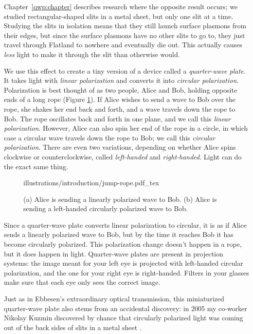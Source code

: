 Chapter~\ref{qwp:chapter} describes research where the opposite result occurs; we studied rectangular-shaped slits in a metal sheet, but only one slit at a time.
Studying the slits in isolation means that they still launch surface plasmons from their edges, but since the surface plasmons have no other slits to go to, they just travel through Flatland to nowhere and eventually die out.
This actually causes \emph{less} light to make it through the slit than otherwise would.

We use this effect to create a tiny version of a device called a \emph{quarter-wave plate}.
It takes light with \emph{linear polarization} and converts it into \emph{circular polarization}.
Polarization is best thought of as two people, Alice and Bob, holding opposite ends of a long rope (Figure \ref{introduction:fig:jump-rope}).
If Alice wishes to send a wave to Bob over the rope, she shakes her end back and forth, and a wave travels down the rope to Bob.
The rope oscillates back and forth in one plane, and we call this \emph{linear polarization}.
However, Alice can also spin her end of the rope in a circle, in which case a circular wave travels down the rope to Bob; we call this \emph{circular polarization}.
There are even two variations, depending on whether Alice spins clockwise or counterclockwise, called \emph{left-handed} and \emph{right-handed}.
Light can do the exact same thing.

\begin{figure}[tb]
  \forceversofloat\centering
  {illustrations/introduction/jump-rope.pdf_tex}
  \caption{(a) Alice is sending a linearly polarized wave to Bob.
(b) Alice is sending a left-handed circularly polarized wave to Bob.}
  \label{introduction:fig:jump-rope}
\end{figure}

Since a quarter-wave plate converts linear polarization to circular, it is as if Alice sends a linearly polarized wave to Bob, but by the time it reaches Bob it has become circularly polarized.
This polarization change doesn't happen in a rope, but it does happen in light.
Quarter-wave plates are present in  projection systems: the image meant for your left eye is projected with left-handed circular polarization, and the one for your right eye is right-handed.
Filters in your  glasses make sure that each eye only sees the correct image.

Just as in Ebbesen's extraordinary optical transmission, this miniaturized quarter-wave plate also stems from an accidental discovery: in 2005 my co-worker Nikolay Kuzmin discovered by chance that circularly polarized light was coming out of the back sides of slits in a metal sheet \cite[pp.~73--87]{KuzminPhDThesis}.

